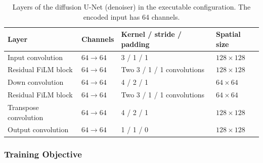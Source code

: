 \documentclass[jimaging,article,submit,pdftex,moreauthors]
  {Definitions/mdpi}
\newcommand{\revbegin}{\begingroup\color{blue}}
\newcommand{\revbegin}{\begingroup}
\newcommand{\revend}{\ifhmode\par\fi\endgroup}
\providecommand{\linelabel}[1]{}
\newcommand{\seclabel}[1]{\linelabel{rev:sec:#1}}
\begin{document}
\begin{table}[htbp]\revbegin{}
\centering
\caption{Layers of the diffusion U-Net (denoiser) in the executable configuration. The encoded input has 64 channels.}
\label{tab:denoiser_layers}
\small
\begin{tabular}{llll}
\toprule
Layer & Channels & Kernel / stride / padding & Spatial size \\
\midrule
Input convolution & $64\rightarrow64$ & 3 / 1 / 1 & $128\times128$ \\
Residual FiLM block & $64\rightarrow64$ & Two 3 / 1 / 1 convolutions & $128\times128$ \\
Down convolution & $64\rightarrow64$ & 4 / 2 / 1 & $64\times64$ \\
Residual FiLM block & $64\rightarrow64$ & Two 3 / 1 / 1 convolutions & $64\times64$ \\
Transpose convolution & $64\rightarrow64$ & 4 / 2 / 1 & $128\times128$ \\
Output convolution & $64\rightarrow64$ & 1 / 1 / 0 & $128\times128$ \\
\bottomrule
\end{tabular}
\revend{}\end{table}

\subsubsection{Training Objective}
\label{sec:objective}
\seclabel{objective}
\end{document}
